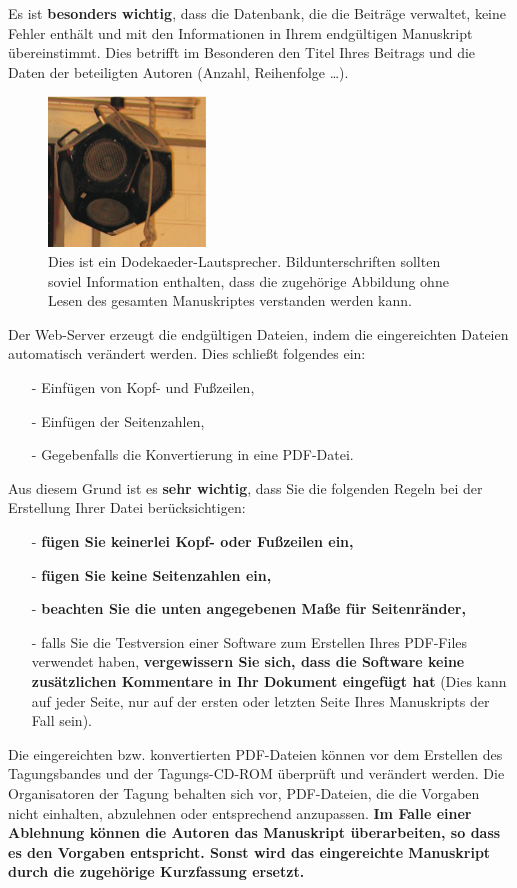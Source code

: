 \documentclass[a4paper, 10pt, twocolumn]{article}
\begin{document}
Es ist \textbf{besonders wichtig}, dass die Datenbank, die die Beiträge verwaltet, keine Fehler enthält und mit den Informationen in Ihrem endgültigen Manuskript übereinstimmt. Dies betrifft im Besonderen den Titel Ihres Beitrags und die Daten der beteiligten Autoren (Anzahl, Reihenfolge \ldots).

\begin{figure}[hbt]
    \begin{center}
        \includegraphics[width=4.2cm]{dode}
    \end{center}
    \caption{Dies ist ein Dodekaeder-Lautsprecher. Bildunterschriften sollten soviel Information enthalten, dass die zugehörige Abbildung ohne Lesen des gesamten Manuskriptes verstanden werden kann.}
    \label{fig:dode}
\end{figure}
Der Web-Server erzeugt die endgültigen Dateien, indem die eingereichten Dateien automatisch verändert werden. Dies schließt folgendes ein:
\begin{itemize}
    \item[-] Einfügen von Kopf- und Fußzeilen,
    \item[-] Einfügen der Seitenzahlen,
    \item[-] Gegebenfalls die Konvertierung in eine PDF-Datei.
\end{itemize}
Aus diesem Grund ist es \textbf{sehr wichtig}, dass Sie die folgenden Regeln bei der Erstellung Ihrer Datei berücksichtigen:
\begin{itemize}
    \item[-] \textbf{fügen Sie keinerlei Kopf- oder Fußzeilen ein,}
    \item[-] \textbf{fügen Sie keine Seitenzahlen ein,}
    \item[-] \textbf{beachten Sie die unten angegebenen Maße für Seitenränder,}
    \item[-] falls Sie die Testversion einer Software zum Erstellen Ihres PDF-Files verwendet haben, \textbf{vergewissern Sie sich, dass die Software keine
    zusätzlichen Kommentare in Ihr Dokument eingefügt hat} (Dies kann auf jeder Seite, nur auf der ersten oder letzten Seite Ihres Manuskripts der Fall
    sein).
\end{itemize}
Die eingereichten bzw. konvertierten PDF-Dateien können vor dem Erstellen des Tagungsbandes und der Tagungs-CD-ROM überprüft und verändert werden. Die Organisatoren der Tagung behalten sich vor, PDF-Dateien, die die Vorgaben nicht einhalten, abzulehnen oder entsprechend anzupassen. \textbf{Im Falle einer Ablehnung können die Autoren das Manuskript überarbeiten, so dass es den Vorgaben entspricht. Sonst wird das eingereichte Manuskript durch die zugehörige Kurzfassung ersetzt.}
\end{document}
